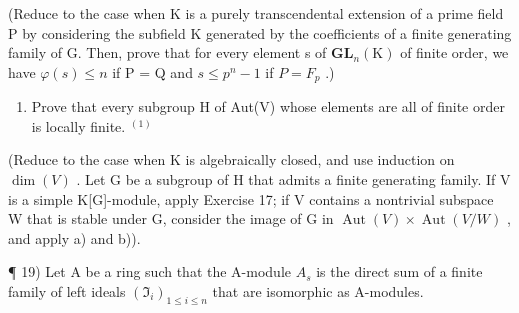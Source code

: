 (Reduce to the case when K is a purely transcendental extension of a prime field P by considering the subfield K generated by the coefficients of a finite generating family of G. Then, prove that for every element s of \(\mathbf{GL}_{n}(\mathrm{K})\) of finite order, we have \(\varphi(s) \leqslant n\) if P = Q and \(s \leqslant p^{n} - 1\) if \(P = F_{p}\) .)

\begin{enumerate}
\def\labelenumi{\alph{enumi})}
\setcounter{enumi}{3}
\tightlist
\item
  Prove that every subgroup H of Aut(V) whose elements are all of finite order is locally finite. \(^{(1)}\)
\end{enumerate}

(Reduce to the case when K is algebraically closed, and use induction on \(\dim(V)\) . Let G be a subgroup of H that admits a finite generating family. If V is a simple K{[}G{]}-module, apply Exercise 17; if V contains a nontrivial subspace W that is stable under G, consider the image of G in \(\operatorname{Aut}(V) \times \operatorname{Aut}(V/W)\) , and apply a) and b)).

¶ 19) Let A be a ring such that the A-module \(A_{s}\) is the direct sum of a finite family of left ideals \((\mathfrak{I}_{i})_{1\leqslant i\leqslant n}\) that are isomorphic as A-modules.

